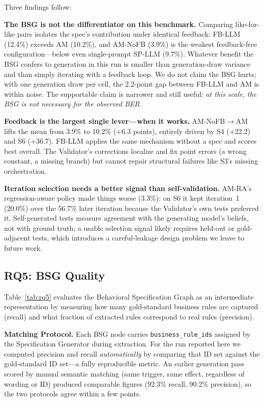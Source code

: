 \documentclass[conference]{IEEEtran}
\begin{document}
Three findings follow:

\textbf{The BSG is not the differentiator on this benchmark.} Comparing like-for-like pairs isolates the spec's contribution under identical feedback: FB-LLM (12.4\%) exceeds AM (10.2\%), and AM-NoFB (3.9\%) is the weakest feedback-free configuration---below even single-prompt SP-LLM (9.7\%). Whatever benefit the BSG confers to generation in this run is smaller than generation-draw variance and than simply iterating with a feedback loop. We do not claim the BSG hurts; with one generation draw per cell, the 2.2-point gap between FB-LLM and AM is within noise. The supportable claim is narrower and still useful: \emph{at this scale, the BSG is not necessary for the observed BER.}

\textbf{Feedback is the largest single lever---when it works.} AM-NoFB$\rightarrow$AM lifts the mean from 3.9\% to 10.2\% (+6.3 points), entirely driven by S4 (+22.2) and S6 (+36.7). FB-LLM applies the same mechanism without a spec and scores best overall. The Validator's corrections localize and fix point errors (a wrong constant, a missing branch) but cannot repair structural failures like S3's missing orchestration.

\textbf{Iteration selection needs a better signal than self-validation.} AM-RA's regression-aware policy made things worse (3.3\%): on S6 it kept iteration~1 (20.0\%) over the 56.7\% later iteration because the Validator's own tests preferred it. Self-generated tests measure agreement with the generating model's beliefs, not with ground truth; a usable selection signal likely requires held-out or gold-adjacent tests, which introduces a careful-leakage design problem we leave to future work.

\subsection{RQ5: BSG Quality}

Table~\ref{tab:rq5} evaluates the Behavioral Specification Graph as an intermediate representation by measuring how many gold-standard business rules are captured (recall) and what fraction of extracted rules correspond to real rules (precision).

\textbf{Matching Protocol.} Each BSG node carries \texttt{business\_rule\_ids} assigned by the Specification Generator during extraction. For the run reported here we computed precision and recall \emph{automatically} by comparing that ID set against the gold-standard ID set---a fully reproducible metric. An earlier generation pass scored by manual semantic matching (same trigger, same effect, regardless of wording or ID) produced comparable figures (92.3\% recall, 90.2\% precision), so the two protocols agree within a few points.
\end{document}
